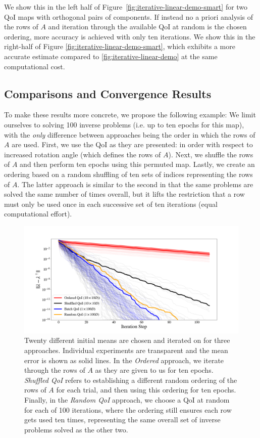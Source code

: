 We show this in the left half of Figure~\ref{fig:iterative-linear-demo-smart} for two QoI maps with orthogonal pairs of components.
If instead no a priori analysis of the rows of $A$ and iteration through the available QoI at random is the chosen ordering, more accuracy is achieved with only ten iterations.
We show this in the right-half of Figure \ref{fig:iterative-linear-demo-smart}, which exhibits a more accurate estimate compared to \ref{fig:iterative-linear-demo} at the same computational cost.


\subsection{Comparisons and Convergence Results}
To make these results more concrete, we propose the following example:
We limit ourselves to solving 100 inverse problems (i.e. up to ten epochs for this map), with the \emph{only} difference between approaches being the order in which the rows of $A$ are used.
First, we use the QoI as they are presented: in order with respect to increased rotation angle (which defines the rows of $A$).
Next, we shuffle the rows of $A$ and then perform ten epochs using this permuted map.
Lastly, we create an ordering based on a random shuffling of ten sets of indices representing the rows of $A$.
The latter approach is similar to the second in that the same problems are solved the same number of times overall, but it lifts the restriction that a row must only be used once in each successive set of ten iterations (equal computational effort).

\begin{figure}
  \centering
  \includegraphics[width=0.95\linewidth]{examples/iterative/10D-convergence-comparison.png}
  \caption{
  Twenty different initial means are chosen and iterated on for three approaches.
  Individual experiments are transparent and the mean error is shown as solid lines.
  In the \emph{Ordered} approach, we iterate through the rows of $A$ as they are given to us for ten epochs.
  \emph{Shuffled QoI} refers to establishing a different random ordering of the rows of $A$ for each trial, and then
  using this ordering for ten epochs.
  Finally, in the \emph{Random QoI} approach, we choose a QoI at random for each of 100 iterations, where the ordering still ensures each row gets used ten times, representing the same overall set of inverse problems solved as the other two.
  }
  \label{fig:iterative-convergence-comparison}
\end{figure}

